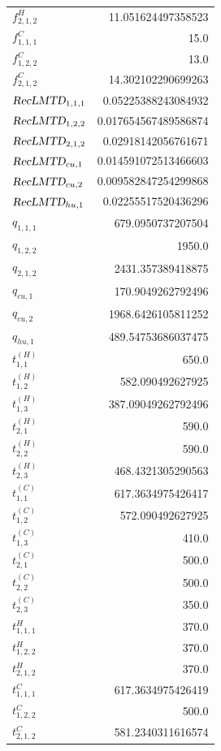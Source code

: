 \documentclass{article}%
\begin{document}
\begin{multicols*}{3}
\begin{supertabular}{lr}
	$f_{2,1,2}^{H}$ & 11.051624497358523 \\%
	$f_{1,1,1}^{C}$ & 15.0 \\%
	$f_{1,2,2}^{C}$ & 13.0 \\%
	$f_{2,1,2}^{C}$ & 14.302102290699263 \\%
	$\textsl{RecLMTD}_{1,1,1}$ & 0.05225388243084932 \\%
	$\textsl{RecLMTD}_{1,2,2}$ & 0.017654567489586874 \\%
	$\textsl{RecLMTD}_{2,1,2}$ & 0.02918142056761671 \\%
	$\textsl{RecLMTD}_{cu,1}$ & 0.014591072513466603 \\%
	$\textsl{RecLMTD}_{cu,2}$ & 0.009582847254299868 \\%
	$\textsl{RecLMTD}_{hu,1}$ & 0.02255517520436296 \\%
	$q_{1,1,1}$ & 679.0950737207504 \\%
	$q_{1,2,2}$ & 1950.0 \\%
	$q_{2,1,2}$ & 2431.357389418875 \\%
	$q_{cu,1}$ & 170.9049262792496 \\%
	$q_{cu,2}$ & 1968.6426105811252 \\%
	$q_{hu,1}$ & 489.54753686037475 \\%
	$t_{1,1}^{(H)}$ & 650.0 \\%
	$t_{1,2}^{(H)}$ & 582.090492627925 \\%
	$t_{1,3}^{(H)}$ & 387.09049262792496 \\%
	$t_{2,1}^{(H)}$ & 590.0 \\%
	$t_{2,2}^{(H)}$ & 590.0 \\%
	$t_{2,3}^{(H)}$ & 468.4321305290563 \\%
	$t_{1,1}^{(C)}$ & 617.3634975426417 \\%
	$t_{1,2}^{(C)}$ & 572.090492627925 \\%
	$t_{1,3}^{(C)}$ & 410.0 \\%
	$t_{2,1}^{(C)}$ & 500.0 \\%
	$t_{2,2}^{(C)}$ & 500.0 \\%
	$t_{2,3}^{(C)}$ & 350.0 \\%
	$t_{1,1,1}^{H}$ & 370.0 \\%
	$t_{1,2,2}^{H}$ & 370.0 \\%
	$t_{2,1,2}^{H}$ & 370.0 \\%
	$t_{1,1,1}^{C}$ & 617.3634975426419 \\%
	$t_{1,2,2}^{C}$ & 500.0 \\%
	$t_{2,1,2}^{C}$ & 581.2340311616574 \\%

\end{supertabular}
\end{multicols*}
\end{document}
